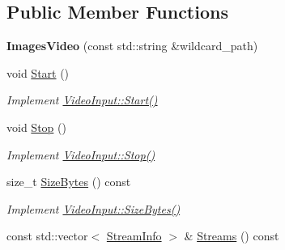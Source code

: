\subsection*{Public Member Functions}
\begin{DoxyCompactItemize}
\item 
{\bfseries Images\+Video} (const std\+::string \&wildcard\+\_\+path)\hypertarget{classpangolin_1_1_images_video_aa39cf8c79c62e7eb89477735b56d5481}{}\label{classpangolin_1_1_images_video_aa39cf8c79c62e7eb89477735b56d5481}

\item 
void \hyperlink{classpangolin_1_1_images_video_a7a6b5ebc7f768b7daefe77c78a1ba2c0}{Start} ()\hypertarget{classpangolin_1_1_images_video_a7a6b5ebc7f768b7daefe77c78a1ba2c0}{}\label{classpangolin_1_1_images_video_a7a6b5ebc7f768b7daefe77c78a1ba2c0}

\begin{DoxyCompactList}\small\item\em Implement \hyperlink{structpangolin_1_1_video_input_a74a2e3e1b87c7cbf9de9bcb39e1df128}{Video\+Input\+::\+Start()} \end{DoxyCompactList}\item 
void \hyperlink{classpangolin_1_1_images_video_a5a4b50d939d7c4745a22e6ededa95ee8}{Stop} ()\hypertarget{classpangolin_1_1_images_video_a5a4b50d939d7c4745a22e6ededa95ee8}{}\label{classpangolin_1_1_images_video_a5a4b50d939d7c4745a22e6ededa95ee8}

\begin{DoxyCompactList}\small\item\em Implement \hyperlink{structpangolin_1_1_video_input_a8945f80194cc7ec9594db7f27e7d09b8}{Video\+Input\+::\+Stop()} \end{DoxyCompactList}\item 
size\+\_\+t \hyperlink{classpangolin_1_1_images_video_a55a141bd595d627a601a1076fb51298c}{Size\+Bytes} () const \hypertarget{classpangolin_1_1_images_video_a55a141bd595d627a601a1076fb51298c}{}\label{classpangolin_1_1_images_video_a55a141bd595d627a601a1076fb51298c}

\begin{DoxyCompactList}\small\item\em Implement \hyperlink{structpangolin_1_1_video_input_a93cee5c33386973a2a51165e6bdcf40b}{Video\+Input\+::\+Size\+Bytes()} \end{DoxyCompactList}\item 
const std\+::vector$<$ \hyperlink{classpangolin_1_1_stream_info}{Stream\+Info} $>$ \& \hyperlink{classpangolin_1_1_images_video_afa5ce7be5d369a860a32db133f618a28}{Streams} () const \hypertarget{classpangolin_1_1_images_video_afa5ce7be5d369a860a32db133f618a28}{}\label{classpangolin_1_1_images_video_afa5ce7be5d369a860a32db133f618a28}


\end{DoxyCompactItemize}
